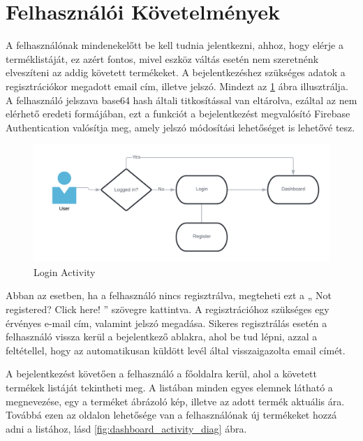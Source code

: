 \section{Felhasználói Követelmények}

A felhasználónak mindenekelőtt be kell tudnia jelentkezni, ahhoz, hogy elérje a terméklistáját, ez azért fontos, mivel eszköz váltás esetén nem szeretnénk elveszíteni az addig követett termékeket. A bejelentkezéshez szükséges adatok a regisztrációkor megadott email cím, illetve jelszó. Mindezt az \ref{fig:login_activity_diag} ábra illusztrálja. A felhasználó jelszava base64 hash általi titkosítással van eltárolva, ezáltal az nem elérhető eredeti formájában, ezt a funkciót a bejelentkezést megvalósító Firebase Authentication valósítja meg, amely jelszó módosítási lehetőséget is lehetővé tesz.

\begin{figure}[h]
    \centering
    \includegraphics[scale=0.5, width=\textwidth]{figures/images/login_activity.png}
    \caption{Login Activity}
    \label{fig:login_activity_diag}
\end{figure}

Abban az esetben, ha a felhasználó nincs regisztrálva, megteheti ezt a „ Not registered? Click here! ” szövegre kattintva. A regisztrációhoz szükséges egy érvényes e-mail cím, valamint jelszó megadása. Sikeres regisztrálás esetén a felhasználó vissza kerül a bejelentkező ablakra, ahol be tud lépni, azzal a feltétellel, hogy az automatikusan küldött levél által visszaigazolta email címét.

A bejelentkezést követően a felhasználó a főoldalra kerül, ahol a követett termékek listáját tekintheti meg. A listában minden egyes elemnek látható a megnevezése, egy a terméket ábrázoló kép, illetve az adott termék aktuális ára. Továbbá ezen az oldalon lehetősége van a felhasználónak új termékeket hozzá adni a listához, lásd \ref{fig:dashboard_activity_diag} ábra.


